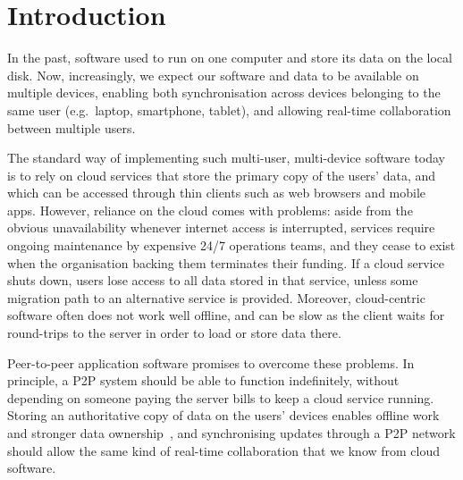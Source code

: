 \documentclass[sigplan,10pt]{acmart}
\begin{document}


\maketitle

\section{Introduction}

In the past, software used to run on one computer and store its data on the local disk.
Now, increasingly, we expect our software and data to be available on multiple devices, enabling both synchronisation across devices belonging to the same user (e.g.\ laptop, smartphone, tablet), and allowing real-time collaboration between multiple users.

The standard way of implementing such multi-user, multi-device software today is to rely on cloud services that store the primary copy of the users' data, and which can be accessed through thin clients such as web browsers and mobile apps.
However, reliance on the cloud comes with problems: aside from the obvious unavailability whenever internet access is interrupted, services require ongoing maintenance by expensive 24/7 operations teams, and they cease to exist when the organisation backing them terminates their funding.
If a cloud service shuts down, users lose access to all data stored in that service, unless some migration path to an alternative service is provided.
Moreover, cloud-centric software often does not work well offline, and can be slow as the client waits for round-trips to the server in order to load or store data there.

Peer-to-peer application software promises to overcome these problems.
In principle, a P2P system should be able to function indefinitely, without depending on someone paying the server bills to keep a cloud service running.
Storing an authoritative copy of data on the users' devices enables offline work and stronger data ownership~\cite{LocalFirst}, and synchronising updates through a P2P network should allow the same kind of real-time collaboration that we know from cloud software.
\end{document}
